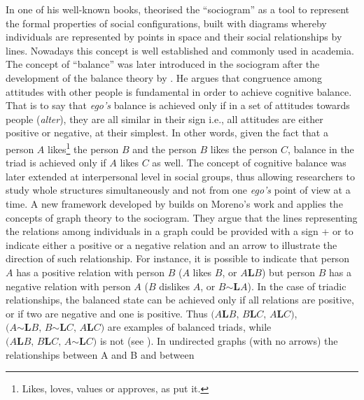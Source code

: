 In one of his well-known books, \citet{J.1934Who-Shall-Survi} theorised
the \textquotedblleft sociogram\textquotedblright{} as a tool to represent
the formal properties of social configurations, built with diagrams
whereby individuals are represented by points in space and their social
relationships by lines. Nowadays this concept is well established
and commonly used in academia. The concept of \textquotedblleft balance\textquotedblright{}
was later introduced in the sociogram after the development of the
balance theory by \citet{Heider1946Attitudes-and-c}. He argues that
congruence among attitudes with other people is fundamental in order
to achieve cognitive balance. That is to say that \textit{ego's} balance
is achieved only if in a set of attitudes towards people (\textit{alter}),
they are all similar in their sign \textendash{} i.e., all attitudes
are either positive or negative, at their simplest. In other words,
given the fact that a person $A$ likes\footnote{Likes, loves, values or approves, as \citet{Cartwright1956Structural-Bala}
put it. } the person $B$ and the person $B$ likes the person $C$, balance
in the triad is achieved only if $A$ likes $C$ as well. The concept
of cognitive balance was later extended at interpersonal level in
social groups, thus allowing researchers to study whole structures
simultaneously and not from one \textit{ego's} point of view at a
time. A new framework developed by \citet{Cartwright1956Structural-Bala}
builds on Moreno's work and applies the concepts of graph theory to
the sociogram. They argue that the lines representing the relations
among individuals in a graph could be provided with a sign + or \textendash{}
to indicate either a positive or a negative relation and an arrow
to illustrate the direction of such relationship. For instance, it
is possible to indicate that person $A$ has a positive relation with
person $B$ ($A$ likes $B$, or $A\mathit{\mathbf{L}B}$) but person
$B$ has a negative relation with person $A$ ($B$ dislikes $A$,
or $B\mathbf{\sim L}A$). In the case of triadic relationships, the
balanced state can be achieved only if all relations are positive,
or if two are negative and one is positive. Thus $(A\mathit{\mathbf{L}B},\,B\mathit{\mathbf{L}C,\,A\mathit{\mathbf{L}C)}}$,
$(A\mathit{\mathbf{\sim L}B},\,B\mathit{\mathbf{\sim L}C,\,A\mathit{\mathbf{L}C)}}$
are examples of balanced triads, while $(A\mathit{\mathbf{L}B},\,B\mathit{\mathbf{L}C,\,A\mathit{\mathbf{\sim L}C)}}$
is not (see ). In undirected
graphs (with no arrows) the relationships between A and B and between
